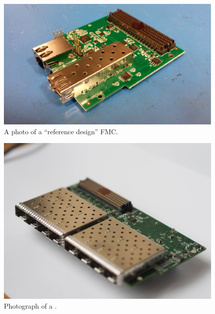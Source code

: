 \documentclass{dune}
\begin{document}
\begin{figure}[h]
\includegraphics[width=\textwidth]{timing_fmc.pdf}
\caption{A photo of a ``reference design'' FMC.}
\label{fig:timing_fmc}
\end{figure}

\begin{figure}[h]
\includegraphics[width=\textwidth]{P7230005.jpg}
\caption{Photograph of a .}
\label{fig:fib_photo}
\end{figure}
\end{document}

